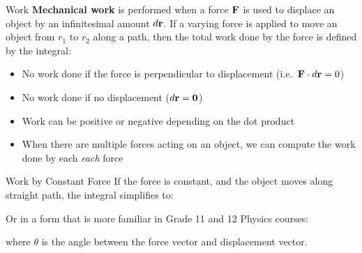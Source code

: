 \documentclass[12pt,compress,aspectratio=169]{beamer}
\newcommand{\mb}[1]{\ensuremath\mathbf{#1}}
\newcommand{\eq}[2]{\vspace{#1}{\Large\begin{displaymath}#2\end{displaymath}}}
\begin{document}
\begin{frame}{Work}
  \textbf{Mechanical work} is performed when a force $\mb{F}$ is used to
  displace an object by an infinitesimal amount $d\mb{r}$. If a varying force
  is applied to move an object from $r_1$ to $r_2$ along a path, then the total
  work done by the force is defined by the integral:

  \eq{-.35in}{
    \boxed{W=\int_{r_1}^{r_2}\mb{F}(r)\cdot d\mb{r}}
  }

  \begin{itemize}
  \item No work done if the force is perpendicular to displacement
    (i.e.\ $\mb{F}\cdot d\mb{r}=0$)
  \item No work done if no displacement ($d\mb{r}=\mb{0}$)
  \item Work can be positive or negative depending on the dot product
  \item When there are multiple forces acting on an object, we can compute the
    work done by each \emph{each} force
  \end{itemize}
\end{frame}



\begin{frame}{Work by Constant Force}
  If the force is constant, and the object moves along straight path, the
  integral simplifies to:

  \eq{-.4in}{
    \boxed{W=\mb{F}\cdot\Delta\mb{r}}
  }

  \vspace{-.2in}Or in a form that is more familiar in Grade 11 and 12 Physics
  courses:

  \eq{-.4in}{
    \boxed{W=F\Delta r\cos\theta}
  }

  \vspace{-.3in}where $\theta$ is the angle between the force vector and
  displacement vector.
\end{frame}
\end{document}
